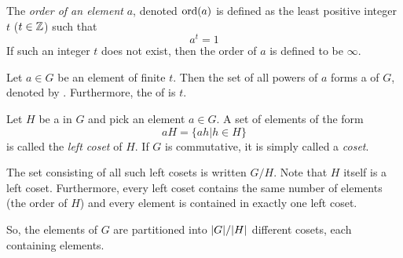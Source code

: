 \begin{definition}\label{def:Element_in_Group_Order}
  The \emph{order of an element} $a$, denoted $\operatorname{\text{ord}}(a)$ is defined as the least positive integer $t$ ($t \in \operatorname{\mathbb{Z}}$) such that
  \begin{equation}\label{eq:Element_in_Group_Order}
    a^{t} = 1
  \end{equation}
  If such an integer $t$ does not exist, then the order of $a$ is defined to be $\infty$.
\end{definition}

\begin{lemma}
  Let $a \in G$ be an element of finite  $t$.
  Then the set of all powers of $a$ forms a   of $G$, denoted by .
  Furthermore, the  of  is $t$.
\end{lemma}

\begin{definition}\label{def:Left_Coset}
  Let $H$ be a  in $G$ and pick an element $a \in G$.
  A set of elements of the form
  \begin{equation}\label{eq:Left_Coset}
    aH = \lbrace ah \vert h \in H \rbrace
  \end{equation}
  is called the \emph{left coset} of $H$.
  If $G$ is commutative, it is simply called a \emph{coset}.

  The set consisting of all such left cosets is written $G/H$.
  Note that $H$ itself is a left coset.
  Furthermore, every left coset contains the same number of elements (the order of $H$) and every element is contained in exactly one left coset.

  So, the elements of $G$ are partitioned into $\lvert G \rvert / \lvert H \rvert$ different cosets, each containing  elements.
\end{definition}

